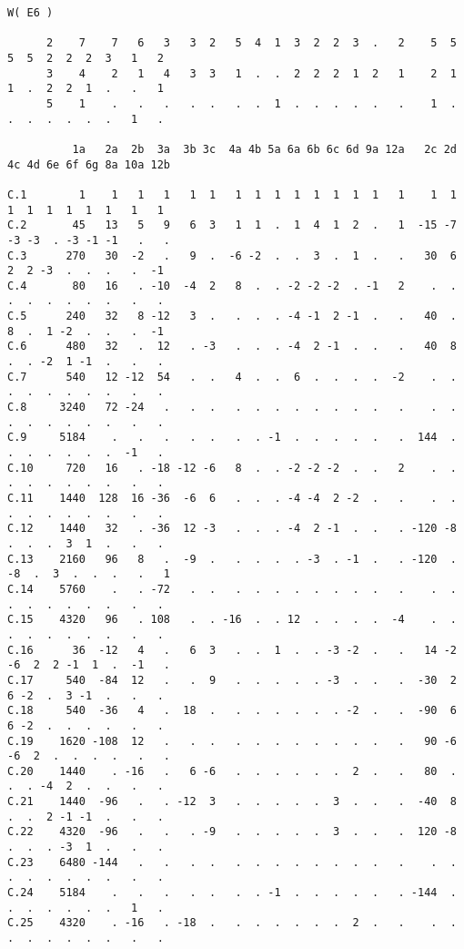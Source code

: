 \documentclass[10pt]{article}
\begin{document}
 \mbox{}
\scriptsize

\begin{verbatim}
W( E6 )

      2    7    7   6   3   3  2   5  4  1  3  2  2  3  .   2    5  5  5  5  2  2  2  3   1   2
      3    4    2   1   4   3  3   1  .  .  2  2  2  1  2   1    2  1  1  .  2  2  1  .   .   1
      5    1    .   .   .   .  .   .  .  1  .  .  .  .  .   .    1  .  .  .  .  .  .  .   1   .

          1a   2a  2b  3a  3b 3c  4a 4b 5a 6a 6b 6c 6d 9a 12a   2c 2d 4c 4d 6e 6f 6g 8a 10a 12b

C.1        1    1   1   1   1  1   1  1  1  1  1  1  1  1   1    1  1  1  1  1  1  1  1   1   1
C.2       45   13   5   9   6  3   1  1  .  1  4  1  2  .   1  -15 -7 -3 -3  . -3 -1 -1   .   .
C.3      270   30  -2   .   9  .  -6 -2  .  .  3  .  1  .   .   30  6  2  2 -3  .  .  .   .  -1
C.4       80   16   . -10  -4  2   8  .  . -2 -2 -2  . -1   2    .  .  .  .  .  .  .  .   .   .
C.5      240   32   8 -12   3  .   .  .  . -4 -1  2 -1  .   .   40  .  8  .  1 -2  .  .   .  -1
C.6      480   32   .  12   . -3   .  .  . -4  2 -1  .  .   .   40  8  .  . -2  1 -1  .   .   .
C.7      540   12 -12  54   .  .   4  .  .  6  .  .  .  .  -2    .  .  .  .  .  .  .  .   .   .
C.8     3240   72 -24   .   .  .   .  .  .  .  .  .  .  .   .    .  .  .  .  .  .  .  .   .   .
C.9     5184    .   .   .   .  .   .  . -1  .  .  .  .  .   .  144  .  .  .  .  .  .  .  -1   .
C.10     720   16   . -18 -12 -6   8  .  . -2 -2 -2  .  .   2    .  .  .  .  .  .  .  .   .   .
C.11    1440  128  16 -36  -6  6   .  .  . -4 -4  2 -2  .   .    .  .  .  .  .  .  .  .   .   .
C.12    1440   32   . -36  12 -3   .  .  . -4  2 -1  .  .   . -120 -8  .  .  .  3  1  .   .   .
C.13    2160   96   8   .  -9  .   .  .  .  . -3  . -1  .   . -120  . -8  .  3  .  .  .   .   1
C.14    5760    .   . -72   .  .   .  .  .  .  .  .  .  .   .    .  .  .  .  .  .  .  .   .   .
C.15    4320   96   . 108   .  . -16  .  . 12  .  .  .  .  -4    .  .  .  .  .  .  .  .   .   .
C.16      36  -12   4   .   6  3   .  .  1  .  . -3 -2  .   .   14 -2 -6  2  2 -1  1  .  -1   .
C.17     540  -84  12   .   .  9   .  .  .  .  . -3  .  .   .  -30  2  6 -2  .  3 -1  .   .   .
C.18     540  -36   4   .  18  .   .  .  .  .  .  . -2  .   .  -90  6  6 -2  .  .  .  .   .   .
C.19    1620 -108  12   .   .  .   .  .  .  .  .  .  .  .   .   90 -6 -6  2  .  .  .  .   .   .
C.20    1440    . -16   .   6 -6   .  .  .  .  .  .  2  .   .   80  .  .  . -4  2  .  .   .   .
C.21    1440  -96   .   . -12  3   .  .  .  .  .  3  .  .   .  -40  8  .  .  2 -1 -1  .   .   .
C.22    4320  -96   .   .   . -9   .  .  .  .  .  3  .  .   .  120 -8  .  .  . -3  1  .   .   .
C.23    6480 -144   .   .   .  .   .  .  .  .  .  .  .  .   .    .  .  .  .  .  .  .  .   .   .
C.24    5184    .   .   .   .  .   .  . -1  .  .  .  .  .   . -144  .  .  .  .  .  .  .   1   .
C.25    4320    . -16   . -18  .   .  .  .  .  .  .  2  .   .    .  .  .  .  .  .  .  .   .   .
\end{verbatim}
\end{document}
